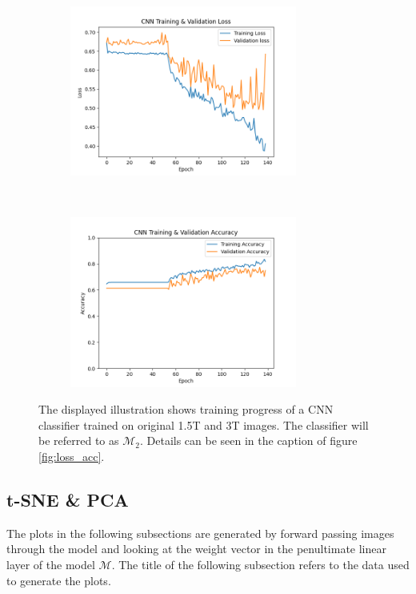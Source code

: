 \documentclass[11pt, fleqn, titlepage]{article}
\newcommand{\1}[1]{\mathds{1}\left[#1\right]}
\begin{document}
\begin{figure}[H]
	\centering
	\begin{subfigure}[t]{0.5\textwidth}
		\centering
		\includegraphics[height=2.2in]{imgs/classifier/lr_0.0002_loss_curve_overfit}%
	\end{subfigure}%
	~
	\begin{subfigure}[t]{0.5\textwidth}
		\centering
		\includegraphics[height=2.2in]{imgs/classifier/lr_0.0002_accuracy_curve_overfit}%
		
	\end{subfigure}
	\caption{The displayed illustration shows training progress of a CNN classifier trained on original 1.5T and 3T images. The classifier will be referred to as $ \mathcal M_2 $. Details can be seen in the caption of figure \ref{fig:loss_acc}.}
	\label{fig:loss_acc_overfit_classifier}
\end{figure}
\vspace*{-2.2cm}
\subsection{t-SNE \& PCA}\label{result_dim_reduction}
\noindent
The plots in the following subsections are generated by forward passing images through the model and looking at the weight vector in the penultimate linear layer of the model $ \mathcal M$. The title of the following subsection refers to the data used to generate the plots.
\vspace*{-0.39cm}
\end{document}
